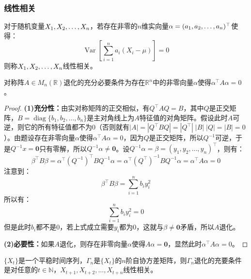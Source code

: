 \subsubsection{线性相关}
\begin{definition}\label{def:RVLinearlyDependent}
	对于随机变量$X_1, X_2, \dots, X_{n}$，若存在非零的$n$维实向量$\alpha=(a_1, a_2, \dots, a_{n})^{\top}$使得：
	\begin{equation*}
		\operatorname{Var}\left[\sum_{i=1}^{n}a_i(X_i-\mu)\right]=0
	\end{equation*}
	则称$X_1, X_2, \dots, X_{n}$线性相关。
\end{definition}
\begin{lemma}\label{lem:aTaInvertible}
	对称阵$A\in M_{n}(\mathbb{R})$退化的充分必要条件为存在$\mathbb{R}^{n}$中的非零向量$\alpha$使得$\alpha^{\top}A\alpha=0$。
\end{lemma}
\begin{proof}
	\textbf{(1)充分性：}由实对称矩阵的正交相似，有$Q^{\top}AQ=B$，其中$Q$是正交矩阵，$B=\operatorname{diag}\{b_1,b_2,\dots,b_n\}$是主对角线上为$A$特征值的对角矩阵。假设此时$A$可逆，则它的所有特征值都不为$0$（否则就有$|A|=|Q^{\top}BQ|=|Q^{\top}|\;|B|\;|Q|=|B|=0$）。由题设存在非零向量$\alpha$使得$\alpha^{\top}A\alpha=0$，因为$Q$是正交矩阵，所以$Q^{-1}$可逆，于是$Q^{-1}x=\mathbf{0}$只有零解，所以$Q^{-1}\alpha\ne\mathbf{0}$。设$Q^{-1}\alpha=\beta=(y_1,y_2,\dots,y_n)^{\top}$，则有：
	\begin{equation*}
		\beta^{\top}B\beta=\alpha^{\top}(Q^{-1})^{\top}BQ^{-1}\alpha=\alpha^{\top}(Q^{\top})^{-1}BQ^{-1}\alpha=\alpha^{\top}A\alpha=0
	\end{equation*}
	注意到：
	\begin{equation*}
		\beta^{\top}B\beta=\sum_{i=1}^{n}b_iy_i^2
	\end{equation*}
	所以有：
	\begin{equation*}
		\sum_{i=1}^{n}b_iy_i^2=0
	\end{equation*}
	但是此时$b_i$都不是$0$，若上式成立需要$y_i$都为$0$，这就与$\beta\ne\mathbf{0}$矛盾，所以$A$退化。\par
	\textbf{(2)必要性：}如果$A$退化，则存在非零向量$\alpha$使得$A\alpha=\mathbf{0}$，显然此时$\alpha^{\top}A\alpha=0$。
\end{proof}
\begin{theorem}\label{theo:TSLinearlyIndependent}
	$\{X_t\}$是一个平稳时间序列，$\Gamma_n$是$\{X_t\}$的$n$阶自协方差矩阵，则$\Gamma_n$退化的充要条件是对任意的$t\in\mathbb{N}$，$X_{t+1},X_{t+2},\dots,X_{t+n}$线性相关。
\end{theorem}
